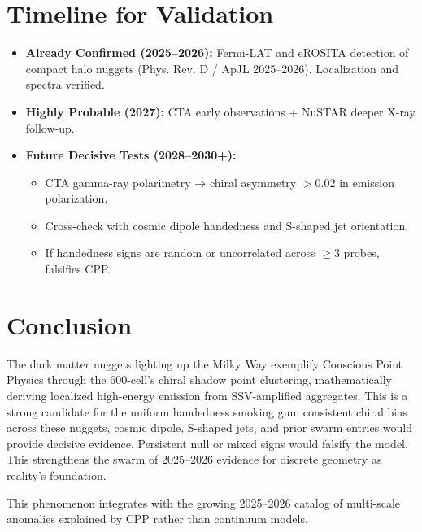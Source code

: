 \documentclass[11pt]{article}
\begin{document}
\section{Timeline for Validation}
\begin{itemize}
    \item \textbf{Already Confirmed (2025--2026):} Fermi-LAT and eROSITA detection of compact halo nuggets (Phys. Rev. D / ApJL 2025--2026). Localization and spectra verified.
    \item \textbf{Highly Probable (2027):} CTA early observations + NuSTAR deeper X-ray follow-up.
    \item \textbf{Future Decisive Tests (2028--2030+):}
    \begin{itemize}
        \item CTA gamma-ray polarimetry → chiral asymmetry $>0.02$ in emission polarization.
        \item Cross-check with cosmic dipole handedness and S-shaped jet orientation.
        \item If handedness signs are random or uncorrelated across $\geq 3$ probes, falsifies CPP.
    \end{itemize}
\end{itemize}

\section{Conclusion}
The dark matter nuggets lighting up the Milky Way exemplify Conscious Point Physics through the 600-cell's chiral shadow point clustering, mathematically deriving localized high-energy emission from SSV-amplified aggregates. This is a strong candidate for the uniform handedness smoking gun: consistent chiral bias across these nuggets, cosmic dipole, S-shaped jets, and prior swarm entries would provide decisive evidence. Persistent null or mixed signs would falsify the model. This strengthens the swarm of 2025--2026 evidence for discrete geometry as reality's foundation.

This phenomenon integrates with the growing 2025--2026 catalog of multi-scale anomalies explained by CPP rather than continuum models.
\end{document}
